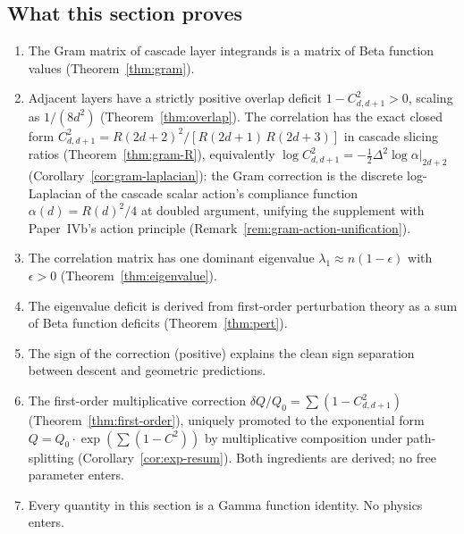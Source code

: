 \documentclass[12pt,a4paper]{article}
\theoremstyle{remark}
\begin{document}

\subsection{What this section proves}

\begin{enumerate}[nosep]
\item The Gram matrix of cascade layer integrands is a matrix of Beta function values (Theorem~\ref{thm:gram}).
\item Adjacent layers have a strictly positive overlap deficit $1 - C_{d,d+1}^2 > 0$, scaling as $1/(8d^2)$ (Theorem~\ref{thm:overlap}). The correlation has the exact closed form $C^2_{d,d+1} = R(2d+2)^2 / [R(2d+1)\,R(2d+3)]$ in cascade slicing ratios (Theorem~\ref{thm:gram-R}), equivalently $\log C^2_{d,d+1} = -\tfrac{1}{2}\Delta^2 \log\alpha\big|_{2d+2}$ (Corollary~\ref{cor:gram-laplacian}): the Gram correction is the discrete log-Laplacian of the cascade scalar action's compliance function $\alpha(d) = R(d)^2/4$ at doubled argument, unifying the supplement with Paper~IVb's action principle (Remark~\ref{rem:gram-action-unification}).
\item The correlation matrix has one dominant eigenvalue $\lambda_1 \approx n(1 - \epsilon)$ with $\epsilon > 0$ (Theorem~\ref{thm:eigenvalue}).
\item The eigenvalue deficit is derived from first-order perturbation theory as a sum of Beta function deficits (Theorem~\ref{thm:pert}).
\item The sign of the correction (positive) explains the clean sign separation between descent and geometric predictions.
\item The first-order multiplicative correction $\delta Q / Q_0 = \sum(1-C^2_{d,d+1})$ (Theorem~\ref{thm:first-order}), uniquely promoted to the exponential form $Q = Q_0 \cdot \exp(\sum(1-C^2))$ by multiplicative composition under path-splitting (Corollary~\ref{cor:exp-resum}). Both ingredients are derived; no free parameter enters.
\item Every quantity in this section is a Gamma function identity. No physics enters.
\end{enumerate}
\end{document}
